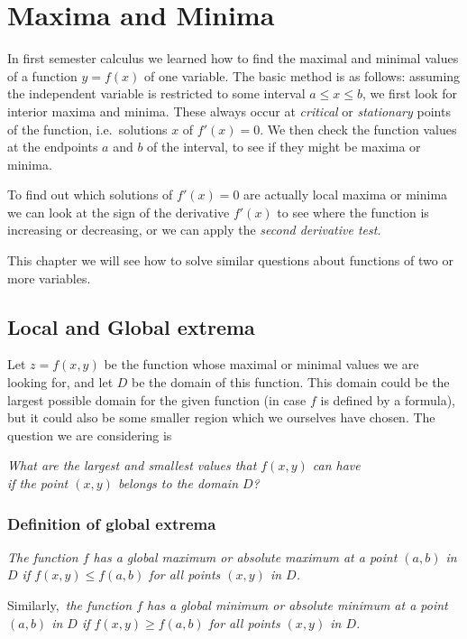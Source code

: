 \chapter{Maxima and Minima}  
In first semester calculus we learned how to find the maximal and minimal values of a
function $y=f(x)$ of one variable.  The basic method is as follows: assuming the
independent variable is restricted to some interval $a\leq x\leq b$, we first look
for interior maxima and minima.  These always occur at \emph{critical} or
\emph{stationary} points of the function, i.e.\ solutions $x$ of $f'(x)=0$.  We then
check the function values at the endpoints $a$ and $b$ of the interval, to see if
they might be maxima or minima.

To find out which solutions of $f'(x)=0$ are actually local maxima or minima we can look
at the sign of the derivative $f'(x)$ to see where the function is increasing or
decreasing, or we can apply the \emph{second derivative test.}

This chapter we will see how to solve similar questions about functions of two
or more variables.

\section{Local and Global extrema}     

\label{sec:local-versus-global} 
Let $z=f(x,y)$ be the function whose maximal or minimal values we are looking
for, and let $D$ be the domain of this function.  This domain could be the
largest possible domain for the given function (in case $f$ is defined by a
formula), but it could also be some smaller region which we ourselves have
chosen.  The question we are considering is
\begin{center}
  \itshape What are the largest and smallest values that $f(x,y)$ can have\\
  if the point $(x,y)$ belongs to the domain $D$?
\end{center}
\subsection{Definition of global extrema}     

\label{sec:def-global-extrema}\itshape 
The function $f$ has a \emph{global maximum} or \emph{absolute maximum} at a
point $(a,b)$ in $D$ if $f(x,y)\leq f(a,b)$ for all points $(x,y)$ in $D$.

\upshape%
Similarly,\itshape\ the function $f$ has a \emph{global minimum} or
\emph{absolute minimum} at a point $(a,b)$ in $D$ if $f(x,y)\geq f(a,b)$ for all
points $(x,y)$ in $D$.


